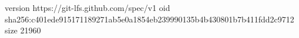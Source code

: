 version https://git-lfs.github.com/spec/v1
oid sha256:c401ede915171189271ab5e0a1854eb239990135b4b430801b7b411fdd2c9712
size 21960
